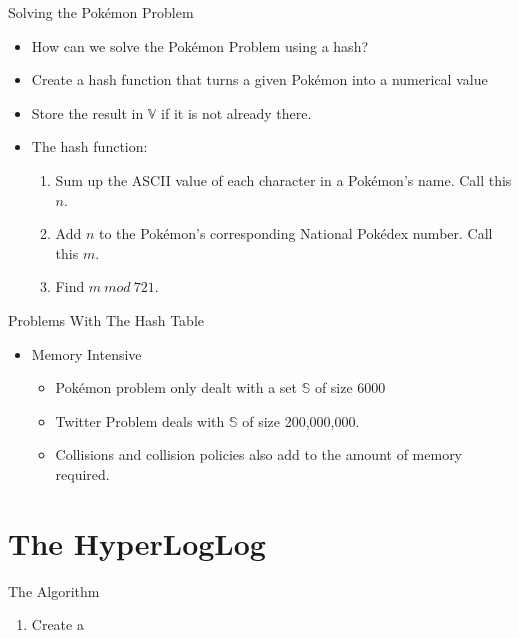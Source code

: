 \documentclass{beamer}
\begin{document}
\begin{frame}{Solving the Pok\'emon Problem}
\begin{itemize}
\pause
\item How can we solve the Pok\'emon Problem using a hash?
\pause
\item Create a hash function that turns a given Pok\'emon into a numerical value
\pause
\item Store the result in $\mathbb{V}$ if it is not already there.
\pause
\item The hash function:
\begin{enumerate}
\item Sum up the ASCII value of each character in a Pok\'emon's name. Call this $n$.
\pause
\item Add $n$ to the Pok\'emon's corresponding National Pok\'edex number. Call this $m$.
\pause
\item Find $m\ mod\ 721$.
\pause
\end{enumerate}
\end{itemize}
\end{frame}

\begin{frame}{Problems With The Hash Table}
\begin{itemize}
\pause
\item Memory Intensive
\begin{itemize}
\item Pok\'emon problem only dealt with a set $\mathbb{S}$ of size 6000
\pause
\item Twitter Problem deals with $\mathbb{S}$ of size 200,000,000.
\pause
\item Collisions and collision policies also add to the amount of memory required.
\end{itemize}
\end{itemize}
\end{frame}

\section{The HyperLogLog}
\begin{frame}{The Algorithm}
\begin{enumerate}
\pause
\item Create a 
\end{enumerate}
\end{frame}
\end{document}
